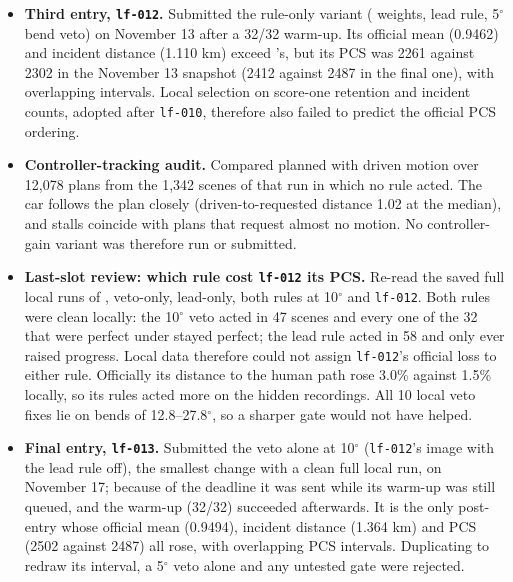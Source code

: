 \begin{itemize}
\item \textbf{Third entry, \texttt{lf-012}.} Submitted the rule-only variant (\lf{} weights, lead rule, 5$^\circ$ bend veto) on November 13 after a 32/32 warm-up. Its official mean (0.9462) and incident distance (1.110 km) exceed \lf{}'s, but its PCS was 2261 against 2302 in the November 13 snapshot (2412 against 2487 in the final one), with overlapping intervals. Local selection on score-one retention and incident counts, adopted after \texttt{lf-010}, therefore also failed to predict the official PCS ordering.
\item \textbf{Controller-tracking audit.} Compared planned with driven motion over 12,078 plans from the 1,342 scenes of that run in which no rule acted. The car follows the plan closely (driven-to-requested distance 1.02 at the median), and stalls coincide with plans that request almost no motion. No controller-gain variant was therefore run or submitted.
\item \textbf{Last-slot review: which rule cost \texttt{lf-012} its PCS.} Re-read the saved full local runs of \lf{}, veto-only, lead-only, both rules at 10$^\circ$ and \texttt{lf-012}. Both rules were clean locally: the 10$^\circ$ veto acted in 47 scenes and every one of the 32 that were perfect under \lf{} stayed perfect; the lead rule acted in 58 and only ever raised progress. Local data therefore could not assign \texttt{lf-012}'s official loss to either rule. Officially its distance to the human path rose 3.0\% against 1.5\% locally, so its rules acted more on the hidden recordings. All 10 local veto fixes lie on bends of 12.8--27.8$^\circ$, so a sharper gate would not have helped.
\item \textbf{Final entry, \texttt{lf-013}.} Submitted the veto alone at 10$^\circ$ (\texttt{lf-012}'s image with the lead rule off), the smallest change with a clean full local run, on November 17; because of the deadline it was sent while its warm-up was still queued, and the warm-up (32/32) succeeded afterwards. It is the only post-\lf{} entry whose official mean (0.9494), incident distance (1.364 km) and PCS (2502 against 2487) all rose, with overlapping PCS intervals. Duplicating \lf{} to redraw its interval, a 5$^\circ$ veto alone and any untested gate were rejected.
\end{itemize}

